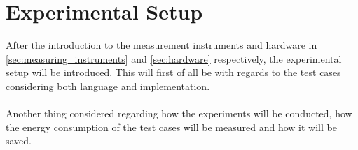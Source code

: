 \section{Experimental Setup}\label{sec:experimental_setup}

After the introduction to the measurement instruments and hardware in \cref{sec:measuring_instruments} and \cref{sec:hardware} respectively, the experimental setup will be introduced. This will first of all be with regards to the test cases considering both language and implementation.

\paragraph*{}
Another thing considered regarding how the experiments will be conducted, how the energy consumption of the test cases will be measured and how it will be saved. 





